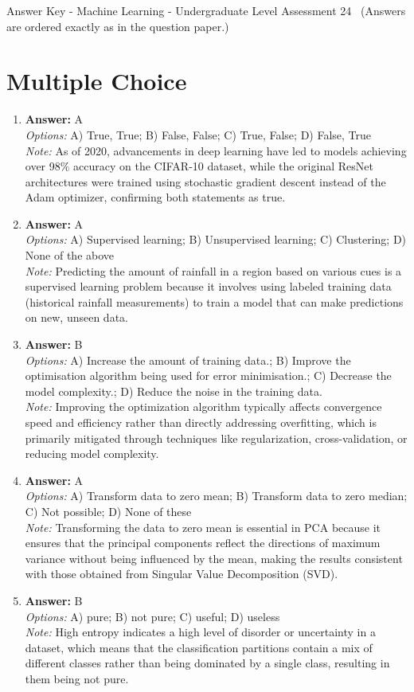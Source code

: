 \documentclass[12pt]{article}
\begin{document}
\begin{center}
Answer Key - Machine Learning - Undergraduate Level Assessment 24 \
\small (Answers are ordered exactly as in the question paper.)
\end{center}

\section*{Multiple Choice}
\begin{enumerate}[label=\arabic*.]
\item \textbf{Answer:} A
\\ \textit{Options:} A) True, True; B) False, False; C) True, False; D) False, True
\\ \textit{Note:} As of 2020, advancements in deep learning have led to models achieving over 98\% accuracy on the CIFAR-10 dataset, while the original ResNet architectures were trained using stochastic gradient descent instead of the Adam optimizer, confirming both statements as true.
\item \textbf{Answer:} A
\\ \textit{Options:} A) Supervised learning; B) Unsupervised learning; C) Clustering; D) None of the above
\\ \textit{Note:} Predicting the amount of rainfall in a region based on various cues is a supervised learning problem because it involves using labeled training data (historical rainfall measurements) to train a model that can make predictions on new, unseen data.
\item \textbf{Answer:} B
\\ \textit{Options:} A) Increase the amount of training data.; B) Improve the optimisation algorithm being used for error minimisation.; C) Decrease the model complexity.; D) Reduce the noise in the training data.
\\ \textit{Note:} Improving the optimization algorithm typically affects convergence speed and efficiency rather than directly addressing overfitting, which is primarily mitigated through techniques like regularization, cross-validation, or reducing model complexity.
\item \textbf{Answer:} A
\\ \textit{Options:} A) Transform data to zero mean; B) Transform data to zero median; C) Not possible; D) None of these
\\ \textit{Note:} Transforming the data to zero mean is essential in PCA because it ensures that the principal components reflect the directions of maximum variance without being influenced by the mean, making the results consistent with those obtained from Singular Value Decomposition (SVD).
\item \textbf{Answer:} B
\\ \textit{Options:} A) pure; B) not pure; C) useful; D) useless
\\ \textit{Note:} High entropy indicates a high level of disorder or uncertainty in a dataset, which means that the classification partitions contain a mix of different classes rather than being dominated by a single class, resulting in them being not pure.
\end{enumerate}
\end{document}
